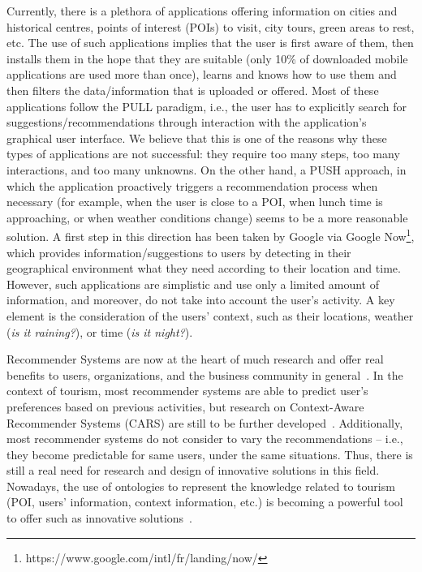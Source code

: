 Currently, there is a plethora of applications offering information on cities and historical centres, points of interest (POIs) to visit, city tours, green areas to rest, etc. The use of such applications implies that the user is first aware of them, then installs them in the hope that they are suitable (only 10\% of downloaded mobile applications are used more than once), learns and knows how
to use them and then filters the data/information that is uploaded or offered. Most of these
applications follow the PULL paradigm, i.e., the user has to explicitly search for
suggestions/recommendations through interaction with the application’s graphical user interface.
We believe that this is one of the reasons why these types of applications are not successful: they
require too many steps, too many interactions, and too many unknowns. On the other hand, a
PUSH approach, in which the application proactively triggers a recommendation process when
necessary (for example, when the user is close to a POI, when lunch time is approaching, or
when weather conditions change) seems to be a more reasonable solution. A first step in this
direction has been taken by Google via Google Now\footnote{https://www.google.com/intl/fr/landing/now/}, 
which provides information/suggestions
to users by detecting in their geographical environment what they need according to their
location and time. However, such applications are simplistic and use only a limited amount of
information, and moreover, do not take into account the user’s activity. A key element is the
consideration of the users' context, such as their locations, weather (\textit{is it raining?}), or time (\textit{is it night?}).

Recommender Systems are now at the heart of
much research and offer real benefits to users, organizations, and the business community in
general~\cite{borras2014intelligent,del2016pull,lim2019tour,leskovec2020mining}. In the context of tourism, most recommender systems are able to predict user's preferences based on previous activities, but research on Context-Aware Recommender Systems
(CARS) are still to be further developed~\cite{adomavicius2011context,haruna2017context,raza2019progress}. 
Additionally, most recommender systems do not consider to vary the recommendations -- i.e., they become predictable  for same users, under the same situations. Thus, there is still a real need for research and design of innovative solutions in this field. Nowadays, the use of ontologies to represent the knowledge related to tourism (POI, users' information, context information, etc.) is becoming a powerful tool to offer such as innovative solutions~\cite{borras2014intelligent,yochum2020linked}.

